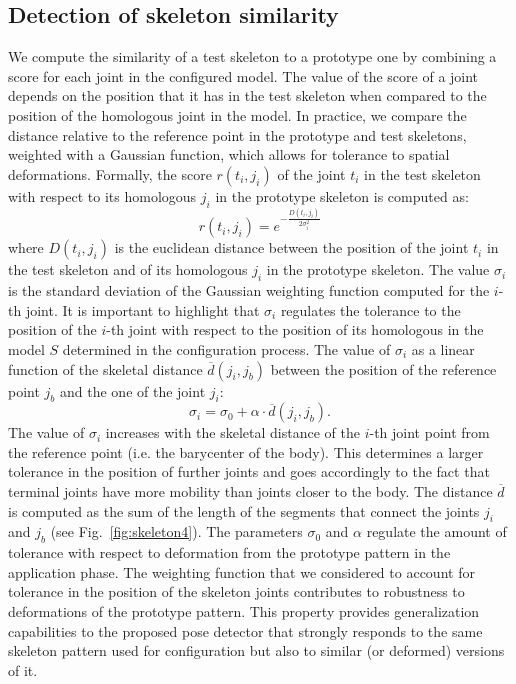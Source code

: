 \documentclass[runningheads,a4paper]{llncs}
\begin{document}
\subsection{Detection of skeleton similarity}
We compute the similarity of a test skeleton to a prototype one by combining a score for each joint in the configured model. The value of the score of a joint depends on the position that it has in the test skeleton when compared to the position of the homologous joint in the model. 
In practice, we compare the distance relative to the reference point in the prototype and test skeletons, weighted with a Gaussian function, which allows for tolerance to spatial deformations.
Formally, the score $r(t_i, j_i)$ of the joint $t_i$ in the test skeleton with respect to its homologous $j_i$ in the prototype skeleton is computed as:
\begin{equation}
r(t_i,j_i) = 
e^{-\frac{D(t_i, j_i)}{2\sigma_i^2}}
\end{equation} 
where $D(t_i ,j_i)$ is the euclidean distance between the position of the joint $t_i$ in the test skeleton and of its homologous $j_i$ in the prototype skeleton. 
The value  $\sigma_i$ is the standard deviation of the Gaussian weighting function computed for the $i$-th joint. It is important to highlight that $\sigma_i$ regulates the tolerance to the position of the $i$-th joint with respect to the position of its homologous in the model $S$ determined in the configuration process.
The value of $\sigma_i$ as a linear function of the skeletal distance $\overline{d}(j_i, j_b)$ between the position of the reference point  $j_b$ and the one of the joint $j_i$:
\begin{equation}
 \sigma_i = \sigma_{0} + \alpha \cdot \overline{d}(j_i, j_b).
\end{equation}
The value of $\sigma_i$ increases with the skeletal distance of the $i$-th joint point from the reference point (i.e. the barycenter of the body). This determines a larger tolerance in the position of further joints and goes accordingly to the fact that terminal joints have more mobility than joints closer to the body.
The distance $\overline{d}$ is computed as the sum of the length of the segments that connect the joints $j_i$ and $j_b$ (see Fig.~\ref{fig:skeleton4}).
The parameters $\sigma_{0}$ and $\alpha$ regulate the amount of tolerance with respect to deformation from the prototype pattern in the application phase. %
The weighting function that we considered to account for tolerance in the position of the skeleton joints contributes to robustness to deformations of the prototype pattern. This property provides generalization capabilities to the proposed pose detector that  strongly responds to the same skeleton pattern used for configuration but also to similar (or deformed) versions of it.
\end{document}
